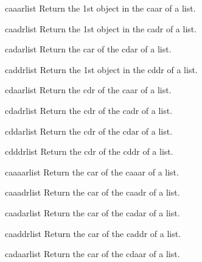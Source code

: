 \documentclass[10pt,english]{book}
\begin{document}
\begin{accessor}{caaar}{list}
  Return the 1st object in the caar of a list.
\end{accessor}

\begin{accessor}{caadr}{list}
  Return the 1st object in the cadr of a list.
\end{accessor}

\begin{accessor}{cadar}{list}
  Return the car of the cdar of a list.
\end{accessor}

\begin{accessor}{caddr}{list}
  Return the 1st object in the cddr of a list.
\end{accessor}

\begin{accessor}{cdaar}{list}
  Return the cdr of the caar of a list.
\end{accessor}

\begin{accessor}{cdadr}{list}
  Return the cdr of the cadr of a list.
\end{accessor}

\begin{accessor}{cddar}{list}
  Return the cdr of the cdar of a list.
\end{accessor}

\begin{accessor}{cdddr}{list}
  Return the cdr of the cddr of a list.
\end{accessor}

\begin{accessor}{caaaar}{list}
  Return the car of the caaar of a list.
\end{accessor}

\begin{accessor}{caaadr}{list}
  Return the car of the caadr of a list.
\end{accessor}

\begin{accessor}{caadar}{list}
  Return the car of the cadar of a list.
\end{accessor}

\begin{accessor}{caaddr}{list}
  Return the car of the caddr of a list.
\end{accessor}

\begin{accessor}{cadaar}{list}
  Return the car of the cdaar of a list.
\end{accessor}
\end{document}
